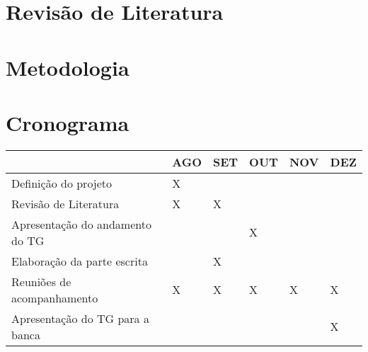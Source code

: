 \documentclass[projtg]{mdtufsm}
\begin{document}
\chapter{Revisão de Literatura}


\chapter{Metodologia}

    
\chapter{Cronograma}
\begin{tabu} to 0.9\linewidth{|X[6]|X|X|X|X|X|}
	\hline
	& AGO & SET & OUT & NOV & DEZ \\
	\hline
	Definição do projeto & X & & & & \\
	\hline
	Revisão de Literatura & X & X & & & \\
	\hline
	Apresentação do andamento do TG & & & X & & \\
	\hline
	Elaboração da parte escrita & & X & & & \\
	\hline
	Reuniões de acompanhamento & X & X & X & X & X \\
	\hline
	Apresentação do TG para a banca & & & & & X \\
	\hline
\end{tabu}
 
\setlength{\baselineskip}{\baselineskip}



\end{document}

